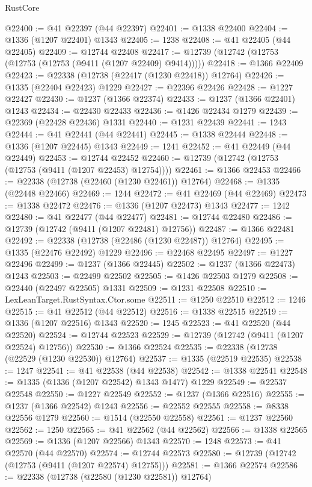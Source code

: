 \begin{lexlean}{RustCore}
\begin{coremodule}
@22400 := @41 @22397 (@44 @22397)
@22401 := @1338 @22400
@22404 := @1336 (@1207 @22401) @1343
@22405 := 1238
@22408 := @41 @22405 (@44 @22405)
@22409 := @12744 @22408
@22417 := @12739 (@12742 (@12753 (@12753 (@12753 (@9411 (@1207 @22409) @9414)))))
@22418 := @1366 @22409
@22423 := @22338 (@12738 (@22417 (@1230 @22418)) @12764)
@22426 := @1335 (@22404 @22423) @1229
@22427 := @22396 @22426
@22428 := @1227 @22427
@22430 := @1237 (@1366 @22374)
@22433 := @1237 (@1366 @22401) @1243
@22434 := @22430 @22433
@22436 := @1426 @22434 @1279
@22439 := @22369 (@22428 @22436) @1331
@22440 := @1231 @22439
@22441 := 1243
@22444 := @41 @22441 (@44 @22441)
@22445 := @1338 @22444
@22448 := @1336 (@1207 @22445) @1343
@22449 := 1241
@22452 := @41 @22449 (@44 @22449)
@22453 := @12744 @22452
@22460 := @12739 (@12742 (@12753 (@12753 (@9411 (@1207 @22453) @12754))))
@22461 := @1366 @22453
@22466 := @22338 (@12738 (@22460 (@1230 @22461)) @12764)
@22468 := @1335 (@22448 @22466)
@22469 := 1244
@22472 := @41 @22469 (@44 @22469)
@22473 := @1338 @22472
@22476 := @1336 (@1207 @22473) @1343
@22477 := 1242
@22480 := @41 @22477 (@44 @22477)
@22481 := @12744 @22480
@22486 := @12739 (@12742 (@9411 (@1207 @22481) @12756))
@22487 := @1366 @22481
@22492 := @22338 (@12738 (@22486 (@1230 @22487)) @12764)
@22495 := @1335 (@22476 @22492) @1229
@22496 := @22468 @22495
@22497 := @1227 @22496
@22499 := @1237 (@1366 @22445)
@22502 := @1237 (@1366 @22473) @1243
@22503 := @22499 @22502
@22505 := @1426 @22503 @1279
@22508 := @22440 (@22497 @22505) @1331
@22509 := @1231 @22508
@22510 := LexLeanTarget.RustSyntax.Ctor.some
@22511 := @1250 @22510
@22512 := 1246
@22515 := @41 @22512 (@44 @22512)
@22516 := @1338 @22515
@22519 := @1336 (@1207 @22516) @1343
@22520 := 1245
@22523 := @41 @22520 (@44 @22520)
@22524 := @12744 @22523
@22529 := @12739 (@12742 (@9411 (@1207 @22524) @12756))
@22530 := @1366 @22524
@22535 := @22338 (@12738 (@22529 (@1230 @22530)) @12764)
@22537 := @1335 (@22519 @22535)
@22538 := 1247
@22541 := @41 @22538 (@44 @22538)
@22542 := @1338 @22541
@22548 := @1335 (@1336 (@1207 @22542) @1343 @1477) @1229
@22549 := @22537 @22548
@22550 := @1227 @22549
@22552 := @1237 (@1366 @22516)
@22555 := @1237 (@1366 @22542) @1243
@22556 := @22552 @22555
@22558 := @8338 @22556 @1279
@22560 := @1514 (@22550 @22558)
@22561 := @1237 @22560
@22562 := 1250
@22565 := @41 @22562 (@44 @22562)
@22566 := @1338 @22565
@22569 := @1336 (@1207 @22566) @1343
@22570 := 1248
@22573 := @41 @22570 (@44 @22570)
@22574 := @12744 @22573
@22580 := @12739 (@12742 (@12753 (@9411 (@1207 @22574) @12755)))
@22581 := @1366 @22574
@22586 := @22338 (@12738 (@22580 (@1230 @22581)) @12764)

\end{coremodule}
\end{lexlean}
